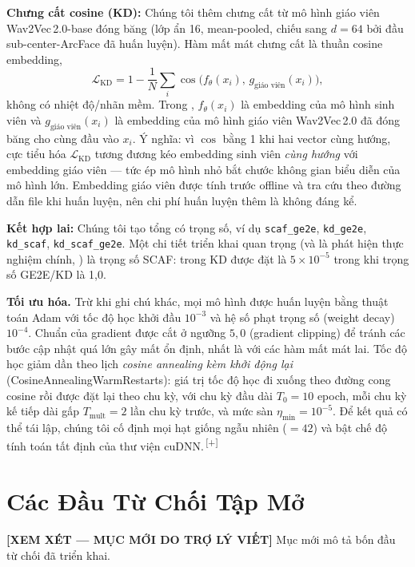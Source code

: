 \documentclass[12pt,a4paper]{report}
\newcommand{\NEW}[1]{{\color{addcolor}#1\,\textsuperscript{\tiny[+]}}}
\newcommand{\reviewnote}[1]{%
    \par\smallskip\noindent
    \colorbox{yellow!35}{\parbox{0.97\linewidth}{\small\textbf{[XEM XÉT — MỤC MỚI DO TRỢ LÝ VIẾT]}\; #1}}%
    \par\smallskip}
\newcommand{\NEW}[1]{#1}
\newcommand{\reviewnote}[1]{}
\newcommand{\code}[1]{\texttt{\small #1}}
\begin{document}
\textbf{Chưng cất cosine (KD):} Chúng tôi thêm chưng cất từ mô hình giáo viên
Wav2Vec\,2.0-base đóng băng (lớp ẩn 16, mean-pooled, chiếu sang $d{=}64$ bởi đầu
sub-center-ArcFace đã huấn luyện). Hàm mất mát chưng cất là thuần cosine embedding,
\begin{equation}
\mathcal{L}_{\text{KD}} = 1 - \frac{1}{N}\sum_i
\cos\!\big(f_\theta(x_i),\, g_{\text{giáo viên}}(x_i)\big),
\label{eq:kd}
\end{equation}
không có nhiệt độ/nhãn mềm. Trong , $f_\theta(x_i)$ là embedding của
mô hình sinh viên và $g_{\text{giáo viên}}(x_i)$ là embedding của mô hình giáo viên
Wav2Vec\,2.0 đã đóng băng cho cùng đầu vào $x_i$. Ý nghĩa: vì $\cos$ bằng 1 khi hai
vector cùng hướng, cực tiểu hóa $\mathcal{L}_{\text{KD}}$ tương đương kéo embedding
sinh viên \emph{cùng hướng} với embedding giáo viên --- tức ép mô hình nhỏ bắt
chước không gian biểu diễn của mô hình lớn. Embedding giáo viên được tính trước
offline và tra cứu theo đường dẫn file khi huấn luyện, nên chi phí huấn luyện thêm
là không đáng kể.

\textbf{Kết hợp lai:} Chúng tôi tạo tổng có trọng số, ví dụ \code{scaf\_ge2e},
\code{kd\_ge2e}, \code{kd\_scaf}, \code{kd\_scaf\_ge2e}. Một chi tiết triển khai
quan trọng (và là phát hiện thực nghiệm chính, ) là trọng số
SCAF: trong KD được đặt là $5\times10^{-5}$ trong khi trọng số GE2E/KD là 1{,}0.

\NEW{\textbf{Tối ưu hóa.} Trừ khi ghi chú khác, mọi mô hình được huấn luyện bằng
thuật toán Adam với tốc độ học khởi đầu $10^{-3}$ và hệ số phạt trọng số (weight
decay) $10^{-4}$. Chuẩn của gradient được cắt ở ngưỡng $5{,}0$ (gradient clipping)
để tránh các bước cập nhật quá lớn gây mất ổn định, nhất là với các hàm mất mát
lai. Tốc độ học giảm dần theo lịch \emph{cosine annealing kèm khởi động lại}
(CosineAnnealingWarmRestarts): giá trị tốc độ học đi xuống theo đường cong cosine
rồi được đặt lại theo chu kỳ, với chu kỳ đầu dài $T_0{=}10$ epoch, mỗi chu kỳ kế
tiếp dài gấp $T_{\text{mult}}{=}2$ lần chu kỳ trước, và mức sàn
$\eta_{\min}{=}10^{-5}$. Để kết quả có thể tái lập, chúng tôi cố định mọi hạt giống
ngẫu nhiên ($=42$) và bật chế độ tính toán tất định của thư viện cuDNN.}

\section{Các Đầu Từ Chối Tập Mở}\label{sec:openset}
\reviewnote{Mục mới mô tả bốn đầu từ chối đã triển khai.}
\end{document}
